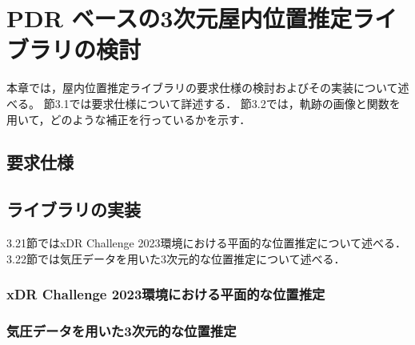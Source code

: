 
\chapter{PDR ベースの3次元屋内位置推定ライブラリの検討}
\thispagestyle{myheadings}
本章では，屋内位置推定ライブラリの要求仕様の検討およびその実装について述べる。
節3.1では要求仕様について詳述する．
節3.2では，軌跡の画像と関数を用いて，どのような補正を行っているかを示す．


\section{要求仕様}






\section{ライブラリの実装}
3.21節ではxDR Challenge 2023環境における平面的な位置推定について述べる．
3.22節では気圧データを用いた3次元的な位置推定について述べる．


\subsection{xDR Challenge 2023環境における平面的な位置推定}











\subsection{気圧データを用いた3次元的な位置推定}



